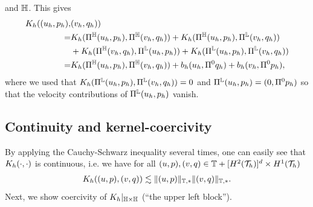 \documentclass[sn-mathphys,Numbered]{sn-jnl}%
\theoremstyle{remark}%
\theoremstyle{definition}%
\begin{document}
and $\mathbb{H}$. This gives
\begin{align} \label{eq::K_on_TT}
  \Kh((u_h,p_h),&(v_h,q_h)) \nonumber \\ =
&\Kh(\Pi^\HH(u_h,p_h),\Pi^\HH(v_h,q_h)) + \Kh(\Pi^{\HH}(u_h,p_h),\Pi^\LL(v_h,q_h)) \nonumber \\
&+ \Kh(\Pi^{\HH}(v_h,q_h),\Pi^\LL(u_h,p_h)) + \Kh(\Pi^{\LL}(u_h,p_h),\Pi^\LL(v_h,q_h)) \nonumber \\ %
  =& \Kh(\Pi^\HH(u_h,p_h),\Pi^\HH(v_h,q_h)) + b_h(u_h,\Pi^0 q_h) + b_h(v_h,\Pi^0p_h),
\end{align}
where we used that $K_h(\Pi^{\mathbb{L}}(u_h,p_h),\Pi^{\mathbb{L}}(v_h,q_h)) = 0$ and $\Pi^{\mathbb{L}}(u_h,p_h) = (0,\Pi^0 p_h)$ so that the velocity contributions of $\Pi^{\mathbb{L}}(u_h,p_h)$ vanish.

\subsection{Continuity and kernel-coercivity}
By applying the Cauchy-Schwarz inequality several times, one can easily see that $K_h(\cdot,\cdot)$ is continuous, i.e. 
we have for all $(u,p), (v,q) \in \mathbb{T} + [H^{2}({\mathcal{T}_h})]^d \times H^1({\mathcal{T}_h})$
\begin{align} \label{eq:Khcontinuity}
    K_h((u,p),(v,q)) \lesssim \Vert (u,p) \Vert_{\mathbb{T},\ast} \Vert (v,q) \Vert_{\mathbb{T}, \ast}.
\end{align}
Next, we show coercivity of $K_h|_{\mathbb{H} \times \mathbb{H}}$ (``the upper left
block''). 
\end{document}
